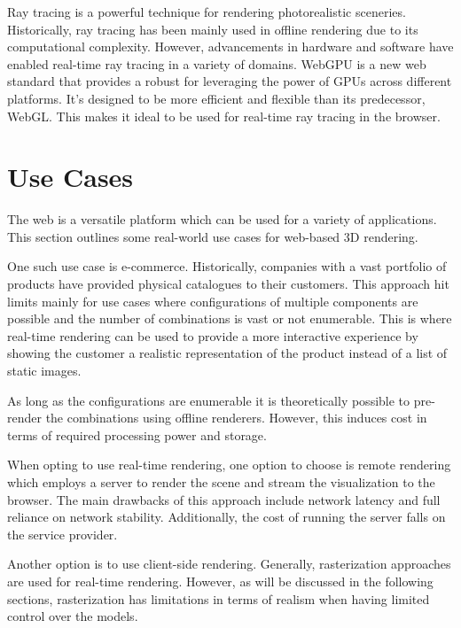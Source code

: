 
Ray tracing is a powerful technique for rendering photorealistic sceneries. Historically, ray tracing has been mainly used in offline rendering due to its computational complexity. However, advancements in hardware and software have enabled real-time ray tracing in a variety of domains.
WebGPU is a new web standard that provides a robust  for leveraging the power of \glspl{GPU} across different platforms. It's designed to be more efficient and flexible than its predecessor, WebGL. This makes it ideal to be used for real-time ray tracing in the browser.

\section{Use Cases}

The web is a versatile platform which can be used for a variety of applications. This section outlines some real-world use cases for web-based 3D rendering.

One such use case is e-commerce. Historically, companies with a vast portfolio of products have provided physical catalogues to their customers. This approach hit limits mainly for use cases where configurations of multiple components are possible and the number of combinations is vast or not enumerable. This is where real-time rendering can be used to provide a more interactive experience by showing the customer a realistic representation of the product instead of a list of static images.

As long as the configurations are enumerable it is theoretically possible to pre-render the combinations using offline renderers. However, this induces cost in terms of required processing power and storage.

When opting to use real-time rendering, one option to choose is remote rendering which employs a server to render the scene and stream the visualization to the browser. The main drawbacks of this approach include network latency and full reliance on network stability. Additionally, the cost of running the server falls on the service provider.

Another option is to use client-side rendering. Generally, rasterization approaches are used for real-time rendering. However, as will be discussed in the following sections, rasterization has limitations in terms of realism when having limited control over the models.

